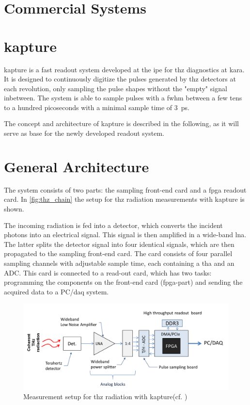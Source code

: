 \section{Commercial Systems}


\section{\gls{kapture}}
\Gls{kapture} is a fast readout system developed at the \Gls{ipe} for \Gls{thz} diagnostics at \gls{kara}. It is designed to continuously digitize the pulses generated by \Gls{thz} detectors at each revolution, only sampling the pulse shapes without the "empty" signal inbetween. The system is able to sample pulses with a \gls{fwhm} between a few tens to a hundred picoseconds with a minimal sample time of \SI{3}{\pico \second}. \cite{caselleKAP}

The concept and architecture of \gls{kapture} is described in the following, as it will serve as base for the newly developed readout system. 

\section{General Architecture}
The system consists of two parts: the sampling front-end card and a \gls{fpga} readout card. In \autoref{fig:thz_chain} the setup for \gls{thz} radiation measurements with \gls{kapture} is shown. 

The incoming radiation is fed into a detector, which converts the incident photons into an electrical signal. This signal is then amplified in a wide-band \gls{lna}. The latter splits the detector signal into four identical signals, which are then propagated to the sampling front-end card. The card consists of four parallel sampling channels with adjustable sample time, each containing a \gls{tha} and an ADC. This card is connected to a read-out card, which has two tasks: programming the components on the front-end card (\gls{fpga}-part) and sending the acquired data to a PC/\gls{daq} system. \cite{caselle2014}

\begin{figure}[tbh]
	\centering
	\includegraphics[width = \textwidth]{chap/03-currentStat/img/thz_chain}
	\caption[THz measurement]{Measurement setup for \gls{thz} radiation with \gls{kapture}(cf. \cite{caselle2014})}
	\label{fig:thz_chain}
\end{figure}

